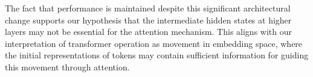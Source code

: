 The fact that performance is maintained despite this significant architectural change supports our hypothesis that the intermediate hidden states at higher layers may not be essential for the attention mechanism. This aligns with our interpretation of transformer operation as movement in embedding space, where the initial representations of tokens may contain sufficient information for guiding this movement through attention.

